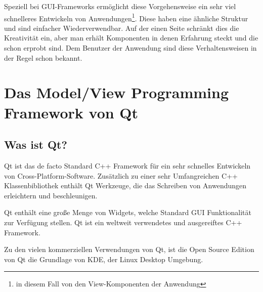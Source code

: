 \documentclass[11pt,a4paper,titlepage]{scrreprt}
\begin{document}
Speziell bei GUI-Frameworks ermöglicht diese Vorgehensweise ein sehr viel schnelleres
Entwickeln von Anwendungen\footnote{in diesem Fall von den View-Komponenten
der Anwendung}. Diese haben eine ähnliche Struktur und sind einfacher Wiederverwendbar.
Auf der einen Seite schränkt dies die Kreativität ein, aber man erhält Komponenten 
in denen Erfahrung steckt und die schon erprobt sind. Dem Benutzer der Anwendung sind
diese Verhaltensweisen in der Regel schon bekannt.

\chapter{Das Model/View Programming Framework von Qt}
\section{Was ist Qt?}
Qt ist das de facto Standard C++ Framework für ein sehr schnelles Entwickeln von
Cross-Platform-Software. Zusätzlich zu einer sehr Umfangreichen C++ Klassenbibliothek
enthält Qt Werkzeuge, die das Schreiben von Anwendungen erleichtern und
beschleunigen.

Qt enthält eine große Menge von Widgets, welche Standard GUI Funktionalität zur
Verfügung stellen. Qt ist ein weltweit verwendetes und ausgereiftes C++ Framework.

Zu den vielen kommerziellen Verwendungen von Qt, ist die Open Source Edition
von Qt die Grundlage von KDE, der Linux Desktop Umgebung.
\end{document}
